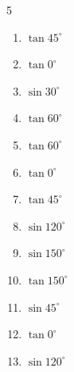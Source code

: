 \begin{multicols}{5}
\begin{enumerate}
  \item $\displaystyle \tan{45^\circ}$

        \phantom{$\displaystyle =1$}

  \item $\displaystyle \tan{0^\circ}$

        \phantom{$\displaystyle =0$}

  \item $\displaystyle \sin{30^\circ}$


  \item $\displaystyle \tan{60^\circ}$


  \item $\displaystyle \tan{60^\circ}$


\columnbreak %

  \item $\displaystyle \tan{0^\circ}$

        \phantom{$\displaystyle =0$}

  \item $\displaystyle \tan{45^\circ}$

        \phantom{$\displaystyle =1$}

  \item $\displaystyle \sin{120^\circ}$


  \item $\displaystyle \sin{150^\circ}$


  \item $\displaystyle \tan{150^\circ}$


  \item $\displaystyle \sin{45^\circ}$


  \item $\displaystyle \tan{0^\circ}$

        \phantom{$\displaystyle =0$}

  \item $\displaystyle \sin{120^\circ}$


\end{enumerate}
\end{multicols}
